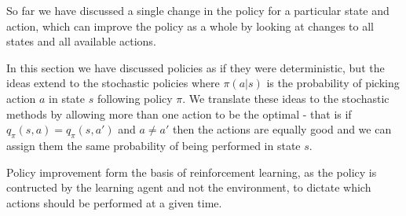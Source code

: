 \documentclass[11pt]{article}
\begin{document}
So far we have discussed a single change in the policy for a
particular state and action,
which can improve the policy as a whole by
looking at changes to all states and all available actions.

In this section we have discussed policies as if they were deterministic,
but the ideas extend to the stochastic policies where $\pi(a|s)$ is the
probability of picking action $a$ in state $s$ following policy $\pi$.
We translate these ideas to the stochastic methods by
allowing more than one action to be the optimal -
that is if $q_\pi(s, a) = q_\pi(s, a')$ and $a \neq a'$ then the actions
are equally good and we can assign them the same probability of being
performed in state $s$.

Policy improvement form the basis of reinforcement learning,
as the policy is contructed by the learning agent and not
the environment, to dictate which actions should be performed at a
given time.
\end{document}
